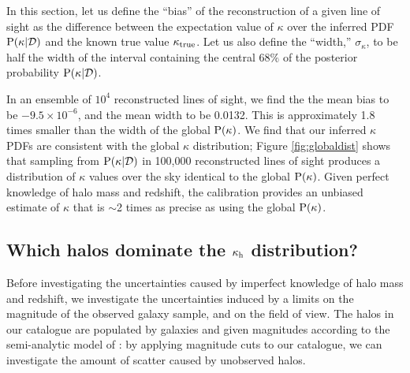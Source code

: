 \documentclass[useAMS,usenatbib]{mn2e}
\begin{document}
%

In this section, let us define the ``bias'' of the reconstruction of a given
line of sight as the difference between the expectation value of $\kappa$ over
the inferred PDF ${\rm P}(\kappa|{\mathcal{D}})$ and the known true value $\kappa_{\rm true}$.
Let us also define the ``width,'' $\sigma_{\kappa}$, to be half the width of
the interval containing the central $68\%$ of the posterior probability
${\rm P}(\kappa|{\mathcal{D}})$. 

In an ensemble of $10^{4}$ reconstructed lines of sight, we find the the mean
bias to be $-9.5\times 10^{-6}$, and the mean width to be 0.0132. This is
approximately 1.8 times smaller than the width of the global ${\rm P}(\kappa)$. 
We find that our inferred $\kappa$ PDFs are consistent with the global
$\kappa$ distribution; Figure \ref{fig:globaldist} shows that sampling from
${\rm P}(\kappa|{\mathcal{D}})$ in 100,000 reconstructed lines of sight produces a
distribution of $\kappa$ values over the sky identical to the global
${\rm P}(\kappa)$. Given perfect knowledge of halo mass and redshift, the
calibration \proceedure provides an unbiased estimate of $\kappa$ that is
$\sim$2 times as precise as using the global ${\rm P}(\kappa)$.


\subsection{Which halos dominate the $\kappa_{\rm h}$ distribution?}

Before investigating the uncertainties caused by imperfect knowledge of halo
mass and redshift, we investigate the uncertainties induced by a limits on the
magnitude of the observed galaxy sample, and on the field of view. The halos
in our catalogue are populated by galaxies and given magnitudes according to
the semi-analytic model of \citet{DeLucia+Blaizot2007}: by applying magnitude
cuts to our catalogue, we can investigate the amount of scatter caused by
unobserved halos. 
\end{document}
